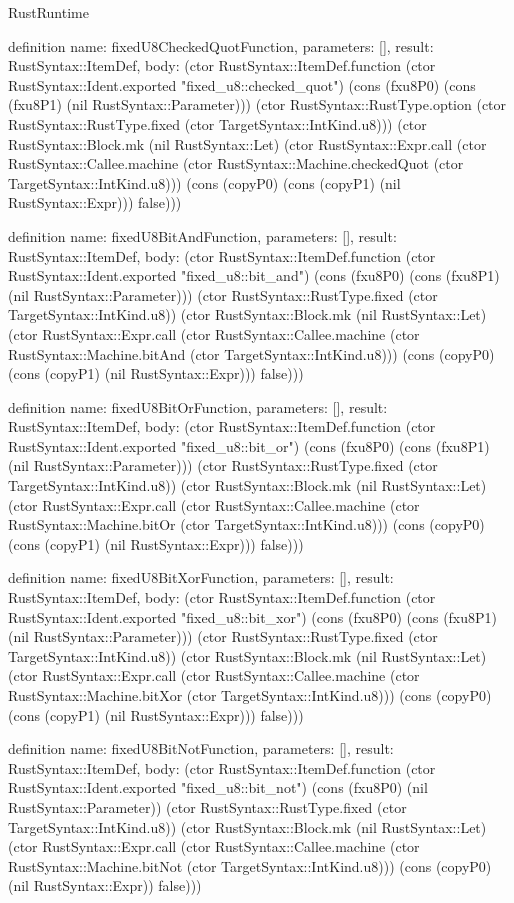 \begin{lexlean}{RustRuntime}
\begin{semanticmodule}
definition{
  name: fixedU8CheckedQuotFunction,
  parameters: [],
  result: RustSyntax::ItemDef,
  body: (ctor RustSyntax::ItemDef.function (ctor RustSyntax::Ident.exported "fixed_u8::checked_quot") (cons (fxu8P0) (cons (fxu8P1) (nil RustSyntax::Parameter))) (ctor RustSyntax::RustType.option (ctor RustSyntax::RustType.fixed (ctor TargetSyntax::IntKind.u8))) (ctor RustSyntax::Block.mk (nil RustSyntax::Let) (ctor RustSyntax::Expr.call (ctor RustSyntax::Callee.machine (ctor RustSyntax::Machine.checkedQuot (ctor TargetSyntax::IntKind.u8))) (cons (copyP0) (cons (copyP1) (nil RustSyntax::Expr))) false)))
}

definition{
  name: fixedU8BitAndFunction,
  parameters: [],
  result: RustSyntax::ItemDef,
  body: (ctor RustSyntax::ItemDef.function (ctor RustSyntax::Ident.exported "fixed_u8::bit_and") (cons (fxu8P0) (cons (fxu8P1) (nil RustSyntax::Parameter))) (ctor RustSyntax::RustType.fixed (ctor TargetSyntax::IntKind.u8)) (ctor RustSyntax::Block.mk (nil RustSyntax::Let) (ctor RustSyntax::Expr.call (ctor RustSyntax::Callee.machine (ctor RustSyntax::Machine.bitAnd (ctor TargetSyntax::IntKind.u8))) (cons (copyP0) (cons (copyP1) (nil RustSyntax::Expr))) false)))
}

definition{
  name: fixedU8BitOrFunction,
  parameters: [],
  result: RustSyntax::ItemDef,
  body: (ctor RustSyntax::ItemDef.function (ctor RustSyntax::Ident.exported "fixed_u8::bit_or") (cons (fxu8P0) (cons (fxu8P1) (nil RustSyntax::Parameter))) (ctor RustSyntax::RustType.fixed (ctor TargetSyntax::IntKind.u8)) (ctor RustSyntax::Block.mk (nil RustSyntax::Let) (ctor RustSyntax::Expr.call (ctor RustSyntax::Callee.machine (ctor RustSyntax::Machine.bitOr (ctor TargetSyntax::IntKind.u8))) (cons (copyP0) (cons (copyP1) (nil RustSyntax::Expr))) false)))
}

definition{
  name: fixedU8BitXorFunction,
  parameters: [],
  result: RustSyntax::ItemDef,
  body: (ctor RustSyntax::ItemDef.function (ctor RustSyntax::Ident.exported "fixed_u8::bit_xor") (cons (fxu8P0) (cons (fxu8P1) (nil RustSyntax::Parameter))) (ctor RustSyntax::RustType.fixed (ctor TargetSyntax::IntKind.u8)) (ctor RustSyntax::Block.mk (nil RustSyntax::Let) (ctor RustSyntax::Expr.call (ctor RustSyntax::Callee.machine (ctor RustSyntax::Machine.bitXor (ctor TargetSyntax::IntKind.u8))) (cons (copyP0) (cons (copyP1) (nil RustSyntax::Expr))) false)))
}

definition{
  name: fixedU8BitNotFunction,
  parameters: [],
  result: RustSyntax::ItemDef,
  body: (ctor RustSyntax::ItemDef.function (ctor RustSyntax::Ident.exported "fixed_u8::bit_not") (cons (fxu8P0) (nil RustSyntax::Parameter)) (ctor RustSyntax::RustType.fixed (ctor TargetSyntax::IntKind.u8)) (ctor RustSyntax::Block.mk (nil RustSyntax::Let) (ctor RustSyntax::Expr.call (ctor RustSyntax::Callee.machine (ctor RustSyntax::Machine.bitNot (ctor TargetSyntax::IntKind.u8))) (cons (copyP0) (nil RustSyntax::Expr)) false)))
}


\end{semanticmodule}
\end{lexlean}
